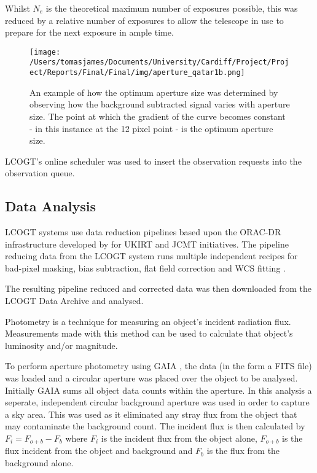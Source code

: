 \documentclass{report}
\begin{document}
Whilst $N_{e}$ is the theoretical maximum number of exposures possible, this was reduced by a relative number of exposures to allow the telescope in use to prepare for the next exposure in ample time. 

\begin{wrapfigure}{r}{0.5\textwidth}
\vspace{-10pt}
\centering
    \texttt{[image: /Users/tomasjames/Documents/University/Cardiff/Project/Project/Reports/Final/Final/img/aperture\_qatar1b.png]}
\caption[An example of how the optimum aperture size was determined by observing how the background subtracted signal varies with aperture size. The point at which the gradient of the curve becomes constant - in this instance at the 12 pixel point - is the optimum aperture size.]{An example of how the optimum aperture size was determined by observing how the background subtracted signal varies with aperture size. The point at which the gradient of the curve becomes constant - in this instance at the 12 pixel point - is the optimum aperture size.} \label{qatar1b}
\vspace{-10pt}
\end{wrapfigure}

LCOGT's online scheduler was used to insert the observation requests into the observation queue.

\subsection{Data Analysis}

LCOGT systems use data reduction pipelines based upon the ORAC-DR infrastructure developed by \textcite{orac-dr} for UKIRT and JCMT initiatives. The pipeline reducing data from the LCOGT system runs multiple independent recipes for bad-pixel masking, bias subtraction, flat field correction and WCS fitting \parencite{pipeline}.  

The resulting pipeline reduced and corrected data was then downloaded from the LCOGT Data Archive and analysed.

Photometry is a technique for measuring an object's incident radiation flux. Measurements made with this method can be used to calculate that object's luminosity and/or magnitude.

To perform aperture photometry using GAIA \parencite{starlink}, the data (in the form a FITS file) was loaded and a circular aperture was placed over the object to be analysed. Initially GAIA sums all object data counts within the aperture. In this analysis a seperate, independent circular background aperture was used in order to capture a sky area. This was used as it eliminated any stray flux from the object that may contaminate the background count. The incident flux is then calculated by $F_{i} = F_{o+b} - F_{b}$ where $F_{i}$ is the incident flux from the object alone, $F_{o+b}$ is the flux incident from the object and background and $F_{b}$ is the flux from the background alone.
\end{document}
